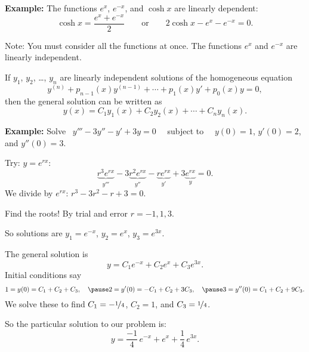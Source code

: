 \documentclass[10pt,aspectratio=169]{beamer}
\begin{document}
\begin{frame}
\textbf{Example:}
The functions $e^x$, $e^{-x}$, and $\cosh x$ are linearly
dependent:
\pause
\[
\cosh x = \frac{e^x + e^{-x}}{2} 
\qquad
\text{or}
\qquad
2 \cosh x - e^x - e^{-x} = 0.
\]

\medskip
\pause

Note: You must consider all the functions at once.
The functions
$e^x$ and $e^{-x}$ are linearly independent.

\pause
\medskip

\begin{theorem}
If $y_1$, $y_2$, \ldots, $y_n$ are linearly independent solutions of the
homogeneous equation 
\[
y^{(n)} + p_{n-1}(x)y^{(n-1)} + \cdots + p_1(x) y' + p_0(x) y = 0 ,
\]
then the general solution can be written as
\begin{equation*}
y(x) = C_1 y_1(x) + C_2 y_2(x) + \cdots + C_n y_n(x) .
\end{equation*}
\end{theorem}
\end{frame}

\begin{frame}
\textbf{Example:}
Solve
~$y''' - 3 y'' - y' + 3y = 0$
~~subject to~~
$y(0) = 1$, $y'(0) = 2$, and $y''(0) = 3$.

\medskip
\pause

Try: $y = e^{rx}$:
\[
\underbrace{r^3 e^{rx}}_{y'''} - 3 \underbrace{r^2 e^{rx}}_{y''} -
\underbrace{r e^{rx}}_{y'} + 3 \underbrace{e^{rx}}_{y} = 0 .
\]
\pause
We divide by $e^{rx}$: \qquad
$r^3 - 3 r^2 - r + 3 = 0$.

\medskip
\pause

Find the roots! \pause By trial and error $r=-1,1,3$.

\medskip
\pause

So solutions are \quad $y_1 = e^{-x}$, \quad $y_2 = e^{x}$, \quad $y_3 =
e^{3x}$.

\medskip
\pause

The general solution is
\[
y = C_1 e^{-x} + C_2 e^{x} + C_3 e^{3x} .
\]
\pause
Initial conditions say
\[
1 = y(0)  = C_1 + C_2 + C_3 , \quad
\pause
2 = y'(0)  = -C_1 + C_2 + 3C_3 , \quad
\pause
3 = y''(0)  = C_1 + C_2 + 9C_3 .
\]
\pause
We solve these to find
$C_1 = -\nicefrac{1}{4}$, $C_2 = 1$, and $C_3 = \nicefrac{1}{4}$.

\medskip
\pause

So the particular solution to our problem is:
\[
y = \frac{-1}{4}\, e^{-x} + e^x + \frac{1}{4}\, e^{3x} .
\]
\end{frame}
\end{document}
